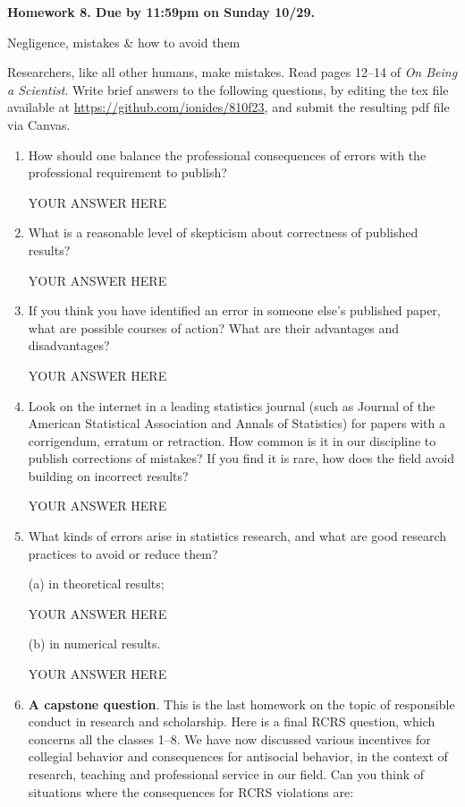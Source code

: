 \documentclass[12pt]{article}
\begin{document}
\begin{center}\bf
Homework 8. Due by 11:59pm on Sunday 10/29.

Negligence, mistakes \& how to avoid them

\end{center}
Researchers, like all other humans, make mistakes. Read pages 12--14 of {\em On Being a Scientist}.  Write brief answers to the following questions, by editing the tex file available at \url{https://github.com/ionides/810f23}, and submit the resulting pdf file via Canvas.

\begin{enumerate}

\item How should one balance the professional consequences of errors with the professional requirement to publish?
  
YOUR ANSWER HERE

\item What is a reasonable level of skepticism about correctness of published results?

YOUR ANSWER HERE
  
\item If you think you have identified an error in someone else's published paper, what are possible courses of action? What are their advantages and disadvantages?

YOUR ANSWER HERE

\item Look on the internet in a leading statistics journal (such as Journal of the American Statistical Association and Annals of Statistics) for papers with a corrigendum, erratum or retraction. How common is it in our discipline to publish corrections of mistakes? If you find it is rare, how does the field avoid building on incorrect results?

YOUR ANSWER HERE

\item What kinds of errors arise in statistics research, and what are good research practices to avoid or reduce them?

(a) in theoretical results;

YOUR ANSWER HERE
    
(b) in numerical results.

YOUR ANSWER HERE

\item {\bf A capstone question}. This is the last homework on the topic of responsible conduct in research and scholarship.  Here is a final RCRS question, which concerns all the classes 1--8. We have now discussed various incentives for collegial behavior and consequences for antisocial behavior, in the context of research, teaching and professional service in our field. Can you think of situations where the consequences for RCRS violations are:


\end{enumerate}
\end{document}
